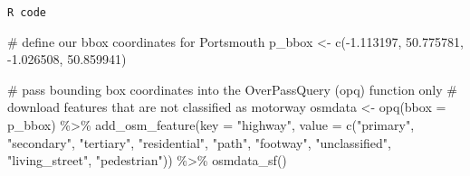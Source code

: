 \documentclass[
  letterpaper,
  DIV=11,
  numbers=noendperiod]{scrreprt}
\newenvironment{Shaded}{\begin{snugshade}}{\end{snugshade}}
\newcommand{\AttributeTok}[1]{\textcolor[rgb]{0.40,0.45,0.13}{#1}}
\newcommand{\CommentTok}[1]{\textcolor[rgb]{0.37,0.37,0.37}{#1}}
\newcommand{\FloatTok}[1]{\textcolor[rgb]{0.68,0.00,0.00}{#1}}
\newcommand{\FunctionTok}[1]{\textcolor[rgb]{0.28,0.35,0.67}{#1}}
\newcommand{\NormalTok}[1]{\textcolor[rgb]{0.00,0.23,0.31}{#1}}
\newcommand{\OtherTok}[1]{\textcolor[rgb]{0.00,0.23,0.31}{#1}}
\newcommand{\SpecialCharTok}[1]{\textcolor[rgb]{0.37,0.37,0.37}{#1}}
\newcommand{\StringTok}[1]{\textcolor[rgb]{0.13,0.47,0.30}{#1}}
\begin{document}
\begin{codelisting}

\caption{\texttt{R code}}

\begin{Shaded}
\begin{Highlighting}[]
\CommentTok{\# define our bbox coordinates for Portsmouth}
\NormalTok{p\_bbox }\OtherTok{\textless{}{-}} \FunctionTok{c}\NormalTok{(}\SpecialCharTok{{-}}\FloatTok{1.113197}\NormalTok{, }\FloatTok{50.775781}\NormalTok{, }\SpecialCharTok{{-}}\FloatTok{1.026508}\NormalTok{, }\FloatTok{50.859941}\NormalTok{)}

\CommentTok{\# pass bounding box coordinates into the OverPassQuery (opq) function only}
\CommentTok{\# download features that are not classified as motorway}
\NormalTok{osmdata }\OtherTok{\textless{}{-}} \FunctionTok{opq}\NormalTok{(}\AttributeTok{bbox =}\NormalTok{ p\_bbox) }\SpecialCharTok{\%\textgreater{}\%}
    \FunctionTok{add\_osm\_feature}\NormalTok{(}\AttributeTok{key =} \StringTok{"highway"}\NormalTok{, }\AttributeTok{value =} \FunctionTok{c}\NormalTok{(}\StringTok{"primary"}\NormalTok{, }\StringTok{"secondary"}\NormalTok{, }\StringTok{"tertiary"}\NormalTok{,}
        \StringTok{"residential"}\NormalTok{, }\StringTok{"path"}\NormalTok{, }\StringTok{"footway"}\NormalTok{, }\StringTok{"unclassified"}\NormalTok{, }\StringTok{"living\_street"}\NormalTok{, }\StringTok{"pedestrian"}\NormalTok{)) }\SpecialCharTok{\%\textgreater{}\%}
    \FunctionTok{osmdata\_sf}\NormalTok{()}
\end{Highlighting}
\end{Shaded}

\end{codelisting}
\end{document}
